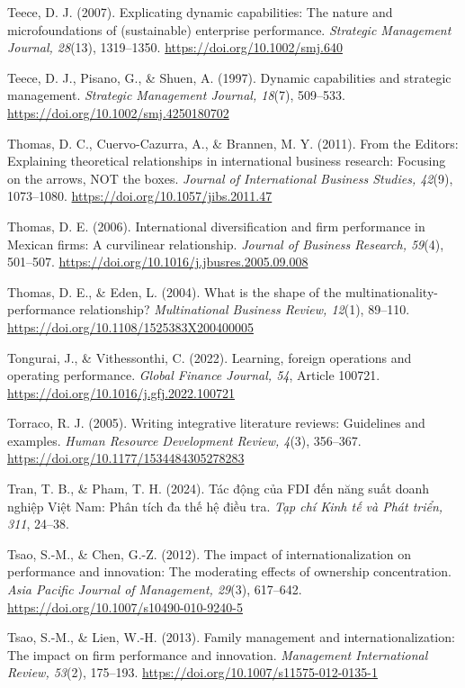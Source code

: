 \documentclass[
  a4paper,
  13pt]{extreport}
\begin{document}
Teece, D. J. (2007). Explicating dynamic capabilities: The nature and
microfoundations of (sustainable) enterprise performance.
\emph{Strategic Management Journal, 28}(13), 1319--1350.
\url{https://doi.org/10.1002/smj.640}

Teece, D. J., Pisano, G., \& Shuen, A. (1997). Dynamic capabilities and
strategic management. \emph{Strategic Management Journal, 18}(7),
509--533. \url{https://doi.org/10.1002/smj.4250180702}

Thomas, D. C., Cuervo-Cazurra, A., \& Brannen, M. Y. (2011). From the
Editors: Explaining theoretical relationships in international business
research: Focusing on the arrows, NOT the boxes. \emph{Journal of
International Business Studies, 42}(9), 1073--1080.
\url{https://doi.org/10.1057/jibs.2011.47}

Thomas, D. E. (2006). International diversification and firm performance
in Mexican firms: A curvilinear relationship. \emph{Journal of Business
Research, 59}(4), 501--507.
\url{https://doi.org/10.1016/j.jbusres.2005.09.008}

Thomas, D. E., \& Eden, L. (2004). What is the shape of the
multinationality-performance relationship? \emph{Multinational Business
Review, 12}(1), 89--110. \url{https://doi.org/10.1108/1525383X200400005}

Tongurai, J., \& Vithessonthi, C. (2022). Learning, foreign operations
and operating performance. \emph{Global Finance Journal, 54}, Article
100721. \url{https://doi.org/10.1016/j.gfj.2022.100721}

Torraco, R. J. (2005). Writing integrative literature reviews:
Guidelines and examples. \emph{Human Resource Development Review, 4}(3),
356--367. \url{https://doi.org/10.1177/1534484305278283}

Tran, T. B., \& Pham, T. H. (2024). Tác động của FDI đến năng suất doanh
nghiệp Việt Nam: Phân tích đa thế hệ điều tra. \emph{Tạp chí Kinh tế và
Phát triển, 311}, 24--38.

Tsao, S.-M., \& Chen, G.-Z. (2012). The impact of internationalization
on performance and innovation: The moderating effects of ownership
concentration. \emph{Asia Pacific Journal of Management, 29}(3),
617--642. \url{https://doi.org/10.1007/s10490-010-9240-5}

Tsao, S.-M., \& Lien, W.-H. (2013). Family management and
internationalization: The impact on firm performance and innovation.
\emph{Management International Review, 53}(2), 175--193.
\url{https://doi.org/10.1007/s11575-012-0135-1}
\end{document}
